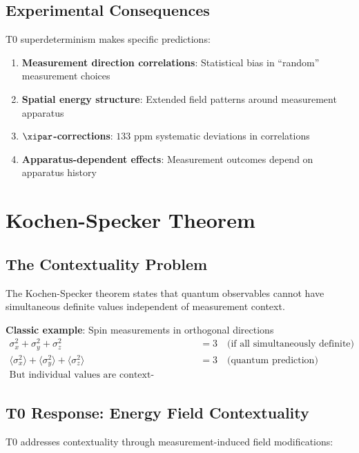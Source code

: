 	\subsection{Experimental Consequences}
	
	T0 superdeterminism makes specific predictions:
	
	\begin{enumerate}
		\item \textbf{Measurement direction correlations}: Statistical bias in ``random'' measurement choices
		\item \textbf{Spatial energy structure}: Extended field patterns around measurement apparatus
		\item \textbf{$\xipar$-corrections}: $133$ ppm systematic deviations in correlations
		\item \textbf{Apparatus-dependent effects}: Measurement outcomes depend on apparatus history
	\end{enumerate}
	
	\section{Kochen-Specker Theorem}
	
	\subsection{The Contextuality Problem}
	
	The Kochen-Specker theorem states that quantum observables cannot have simultaneous definite values independent of measurement context.
	
	\textbf{Classic example}: Spin measurements in orthogonal directions
	\begin{align}
		\sigma_x^2 + \sigma_y^2 + \sigma_z^2 &= 3 \quad \text{(if all simultaneously definite)} \\
		\langle\sigma_x^2\rangle + \langle\sigma_y^2\rangle + \langle\sigma_z^2\rangle &= 3 \quad \text{(quantum prediction)} \\
		\text{But individual values are context-dependent!}
	\end{align}
	
	\subsection{T0 Response: Energy Field Contextuality}
	
	T0 addresses contextuality through measurement-induced field modifications:
	
